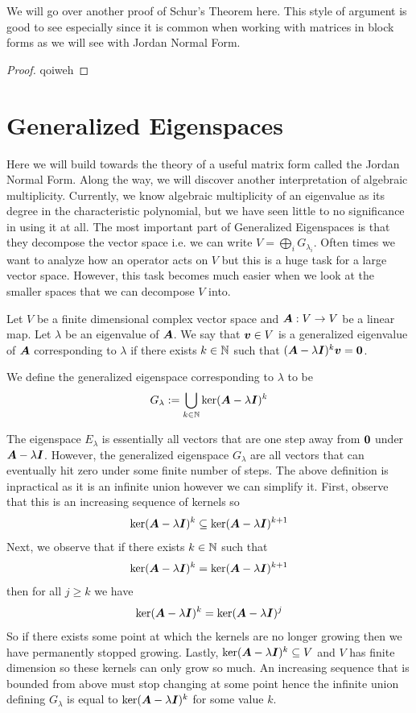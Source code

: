 We will go over another proof of Schur's Theorem here. This style of argument is good to see especially since it is common when working with matrices in block forms as we will see with Jordan Normal Form.

\begin{proof}
    qoiweh
\end{proof}

\section{Generalized Eigenspaces}

Here we will build towards the theory of a useful matrix form called the Jordan Normal Form. Along the way, we will discover another interpretation of algebraic multiplicity. Currently, we know algebraic multiplicity of an eigenvalue as its degree in the characteristic polynomial, but we have seen little to no significance in using it at all. The most important part of Generalized Eigenspaces is that they decompose the vector space i.e. we can write $V=\bigoplus_i G_{\lambda_i}$. Often times we want to analyze how an operator acts on $V$ but this is a huge task for a large vector space. However, this task becomes much easier when we look at the smaller spaces that we can decompose $V$ into.

\begin{definition}
    Let $V$ be a finite dimensional complex vector space and $\boldsymbol{A}:V\to V$ be a linear map. Let $\lambda$ be an eigenvalue of $\boldsymbol{A}$. We say that $\boldsymbol{v}\in V$ is a generalized eigenvalue of $\boldsymbol{A}$ corresponding to $\lambda$ if there exists $k\in\mathbb{N}$ such that $(\boldsymbol{A}-\lambda\boldsymbol{I})^k\boldsymbol{v}=\boldsymbol{0}$.
\end{definition}

\begin{definition}
    We define the generalized eigenspace corresponding to $\lambda$ to be
    \[
    G_\lambda :=\bigcup_{k\in\mathbb{N}}\ker(\boldsymbol{A}-\lambda\boldsymbol{I})^k
    \]
\end{definition}

The eigenspace $E_{\lambda}$ is essentially all vectors that are one step away from $\boldsymbol{0}$ under $\boldsymbol{A}-\lambda\boldsymbol{I}$. However, the generalized eigenspace $G_{\lambda}$ are all vectors that can eventually hit zero under some finite number of steps. The above definition is inpractical as it is an infinite union however we can simplify it. First, observe that this is an increasing sequence of kernels so
\[
\ker(\boldsymbol{A}-\lambda\boldsymbol{I})^k\subseteq\ker(\boldsymbol{A}-\lambda\boldsymbol{I})^{k+1}
\]
Next, we observe that if there exists $k\in\mathbb{N}$ such that
\[
\ker(\boldsymbol{A}-\lambda\boldsymbol{I})^k=\ker(\boldsymbol{A}-\lambda\boldsymbol{I})^{k+1}
\]
then for all $j\geq k$ we have
\[
\ker(\boldsymbol{A}-\lambda\boldsymbol{I})^k=\ker(\boldsymbol{A}-\lambda\boldsymbol{I})^{j}
\]
So if there exists some point at which the kernels are no longer growing then we have permanently stopped growing. Lastly, $\ker(\boldsymbol{A}-\lambda\boldsymbol{I})^k\subseteq V$ and $V$ has finite dimension so these kernels can only grow so much. An increasing sequence that is bounded from above must stop changing at some point hence the infinite union defining $G_{\lambda}$ is equal to $\ker(\boldsymbol{A}-\lambda\boldsymbol{I})^k$ for some value $k$.

